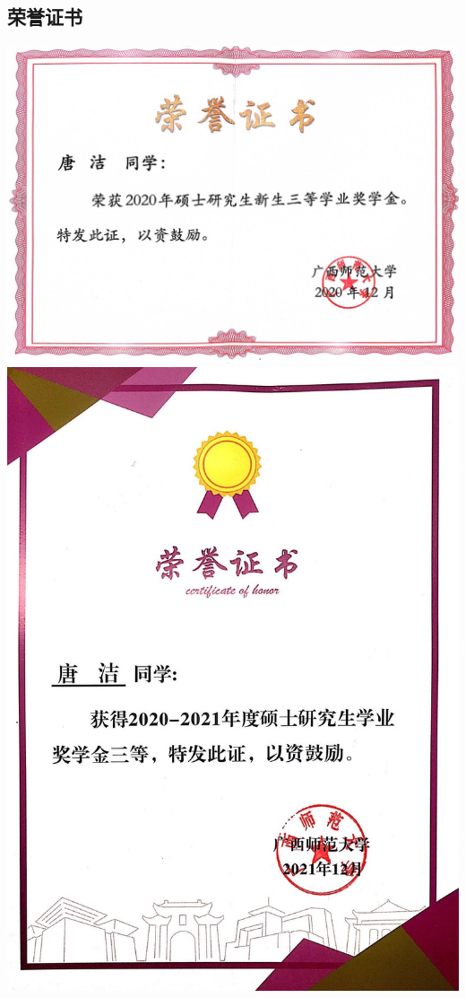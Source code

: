 \documentclass[UFT8]{ctexart}%
\begin{document}
\subsection{荣誉证书}
\begin{center}
 \includegraphics[scale=0.22]{figs/2020-12.jpg }
  \includegraphics[scale=0.15]{figs/2021-12.jpg }

\end{center}
\end{document}
